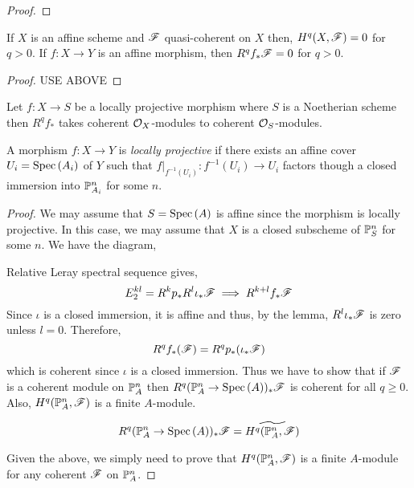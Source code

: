 \documentclass[12pt]{article}
\begin{document}
\begin{proof}

\end{proof}

\begin{lemma}
If $X$ is an affine scheme and $\F$ quasi-coherent on $X$ then, $H^q(X, \F) = 0$ for $q > 0$. If $f : X \to Y$ is an affine morphism, then $R^q f_* \F = 0$ for $q > 0$. 
\end{lemma}

\begin{proof}
USE ABOVE
\end{proof}


\begin{theorem}[Part I]
Let $f : X \to S$ be a locally projective morphism where $S$ is a Noetherian scheme then $R^q f_*$ takes coherent $\struct{X}$-modules to coherent $\struct{S}$-modules. 
\end{theorem}


\begin{definition}
A morphism $f : X \to Y$ is \textit{locally projective} if there exists an affine cover $U_i = \Spec{A_i}$ of $Y$ such that $f|_{f^{-1}(U_i)} : f^{-1}(U_i) \to U_i$ factors though a closed immersion into $\P_{A_i}^n$ for some $n$. 
\end{definition}

\begin{proof}
We may assume that $S = \Spec{A}$ is affine since the morphism is locally projective. In this case, we may assume that $X$ is a closed subscheme of $\P^n_S$ for some $n$. We have the diagram,
\begin{center}
\end{center}
Relative Leray spectral sequence gives,
\[ E_2^{kl} = R^k p_* R^l \iota_* \F \implies R^{k + l} f_* \F \]
Since $\iota$ is a closed immersion, it is affine and thus, by the lemma, $R^l \iota_* \F$ is zero unless $l = 0$. Therefore,
\[ R^q f_*(\F) = R^q p_* (\iota_* \F) \]
which is coherent since $\iota$ is a closed immersion. Thus we have to show that if $\F$ is a coherent module on $\P_A^n$ then $R^q(\P_A^n \to \Spec{A})_* \F$ is coherent for all $q \ge 0$. Also, $H^q(\P^n_A, \F)$ is a finite $A$-module.
\begin{proposition}
\[ R^q(\P_A^n \to \Spec{A})_* \F = \widetilde{H^q(\P_A^n, \F)} \]
\end{proposition} 
Given the above, we simply need to prove that $H^q(\P^n_A, \F)$ is a finite $A$-module for any coherent $\F$ on $\P^n_A$. 
\end{proof}
\end{document}

